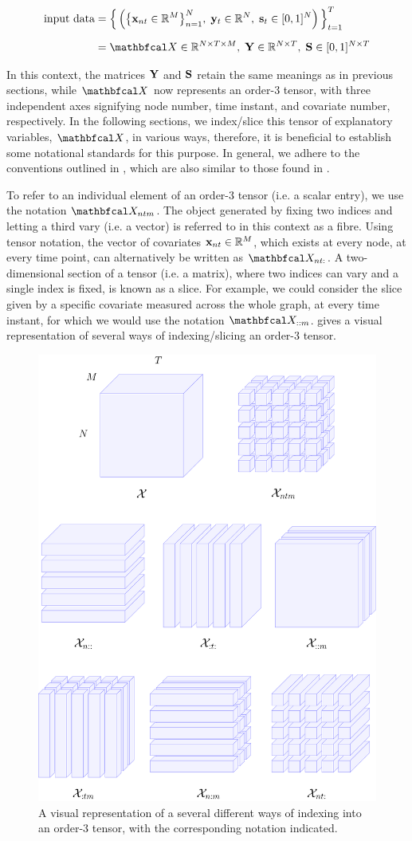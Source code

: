 \begin{align*}
    \text{input data} &= \Big\{ \left( \big\{ \x_{nt} \in \R^M \big\}_{n=1}^N, \; \y_t \in \R^N, \; \s_t \in [0, 1]^N \right)\Big\}_{t=1}^T \\[0.2cm]
    &= \Xt \in \R^{N \times T \times M}, \; \Y \in \R^{N \times T}, \; \Ss \in [0, 1]^{N \times T}
\end{align*}

In this context, the matrices $\mathbf{Y}$ and $\mathbf{S}$ retain the same meanings as in previous sections, while $\Xt$ now represents an order-3 tensor, with three independent axes signifying node number, time instant, and covariate number, respectively. In the following sections, we index/slice this tensor of explanatory variables, $\Xt$, in various ways, therefore, it is beneficial to establish some notational standards for this purpose. In general, we adhere to the conventions outlined in \cite{Kolda2009}, which are also similar to those found in \cite{Kiers2000}. 

To refer to an individual element of an order-3 tensor (i.e. a scalar entry), we use the notation $\Xt_{ntm}$. The object generated by fixing two indices and letting a third vary (i.e. a vector) is referred to in this context as a fibre. Using tensor notation, the vector of covariates $\mathbf{x}_{nt} \in \mathbb{R}^{M}$, which exists at every node, at every time point, can alternatively be written as $\Xt_{nt:}$. A two-dimensional section of a tensor (i.e. a matrix), where two indices can vary and a single index is fixed, is known as a slice. For example, we could consider the slice given by a specific covariate measured across the whole graph, at every time instant, for which we would use the notation $\Xt_{::m}$.  gives a visual representation of several ways of indexing/slicing an order-3 tensor. 


\begin{figure}[t] 
    \centering
    \includegraphics[width=0.6\linewidth]{Figures/X_tensor.pdf}
    \caption[Tensor indexing notation]{A visual representation of a several different ways of indexing into an order-3 tensor, with the corresponding notation indicated.}
    \label{fig:X_tensor_indexing}
\end{figure}



